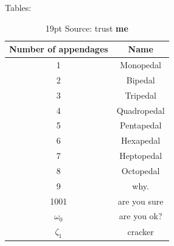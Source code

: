 \documentclass[a4paper]{article}
\newcommand{\fnt}{
\fontshape{n}
\fontsize{14pt} {19pt}
\linespread{0.8}
\selectfont
} %
\let\oldCaption\caption
\renewcommand{\caption}[1]{
\oldCaption{\fnt #1}
} %
\newcommand{\tbln}{
    \newline 
    \hspace*{10mm}
} %
\begin{document}
\tbln Tables:
\begin{table}[h!]
\begin{center}
\begin{tabular}{|c|c|}\hline
 Number of appendages &  Name\\ \hline
\hline
 1 &  Monopedal\\ \hline
 2 &  Bipedal\\ \hline
 3 &  Tripedal\\ \hline
 4 &  Quadropedal\\ \hline
 5 &  Pentapedal\\ \hline
 6 &  Hexapedal\\ \hline
 7 &  Heptopedal\\ \hline
 8 &  Octopedal\\ \hline
 9 &  why.\\ \hline
 1001 &  are you sure\\ \hline
 $\omega_0$ &  are you ok?\\ \hline
 $\zeta_1$ &  cracker\\ \hline
\end{tabular}
\caption{\capfnt Source: trust \textbf{me}}
\label{tab:pedals}
\end{center}
\end{table}
\end{document}
